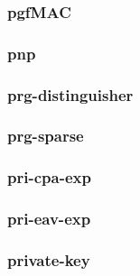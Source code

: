 \begin{frame} \frametitle{pgfMAC}
\begin{figure}
\begin{center}

\end{center}
\end{figure}
\end{frame}
\begin{frame} \frametitle{pnp}
\begin{figure}
\begin{center}

\end{center}
\end{figure}
\end{frame}
\begin{frame} \frametitle{prg-distinguisher}
\begin{figure}
\begin{center}

\end{center}
\end{figure}
\end{frame}
\begin{frame} \frametitle{prg-sparse}
\begin{figure}
\begin{center}

\end{center}
\end{figure}
\end{frame}
\begin{frame} \frametitle{pri-cpa-exp}
\begin{figure}
\begin{center}

\end{center}
\end{figure}
\end{frame}
\begin{frame} \frametitle{pri-eav-exp}
\begin{figure}
\begin{center}

\end{center}
\end{figure}
\end{frame}
\begin{frame} \frametitle{private-key}
\begin{figure}
\begin{center}

\end{center}
\end{figure}
\end{frame}
